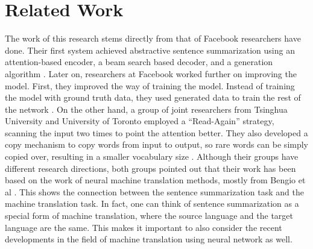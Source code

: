 \documentclass[letterpaper]{article} %
\begin{document}
\section{Related Work}
The work of this research stems directly from that of Facebook researchers have done. Their first system achieved abstractive sentence summarization using an attention-based encoder, a beam search based decoder, and a generation algorithm \cite{rush2015neural}. Later on, researchers at Facebook worked further on improving the model. First, they improved the way of training the model. Instead of training the model with ground truth data, they used generated data to train the rest of the network \cite{ranzato2015sequence}. On the other hand, a group of joint researchers from Tsinghua University and University of Toronto employed a “Read-Again” strategy, scanning the input two times to point the attention better. They also developed a copy mechanism to copy words from input to output, so rare words can be simply copied over, resulting in a smaller vocabulary size \cite{zeng2016efficient}. Although their groups have different research directions, both groups pointed out that their work has been based on the work of neural machine translation methods, mostly from Bengio et al \cite{bahdanau2014neural}. This shows the connection between the sentence summarization task and the machine translation task. In fact, one can think of sentence summarization as a special form of machine translation, where the source language and the target language are the same. This makes it important to also consider the recent developments in the field of machine translation using neural network as well.
\end{document}
